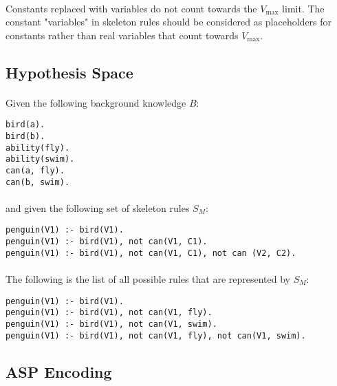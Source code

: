 \documentclass{article}
\theoremstyle{plain}
\theoremstyle{definition}
\begin{document}
\begin{multicols}{2}
\paragraph{} Constants replaced with variables do not count towards the $V_\text{max}$ limit. \cite[p. 6]{lawnonmonotonic} The constant "variables" in skeleton rules should be considered as placeholders for constants rather than real variables that count towards $V_\text{max}$.

\subsection{Hypothesis Space}\label{sec:ASPALHypothesisSpace}

\paragraph{} Given the following background knowledge $B$:

\begin{lstlisting}
bird(a).
bird(b).
ability(fly).
ability(swim).
can(a, fly).
can(b, swim).
\end{lstlisting}

\paragraph{} and given the following set of skeleton rules $S_M$:

\begin{lstlisting}
penguin(V1) :- bird(V1).
penguin(V1) :- bird(V1), not can(V1, C1).
penguin(V1) :- bird(V1), not can(V1, C1), not can (V2, C2).
\end{lstlisting}

\paragraph{} The following is the list of all possible rules that are represented by $S_M$:

\begin{lstlisting}
penguin(V1) :- bird(V1).
penguin(V1) :- bird(V1), not can(V1, fly).
penguin(V1) :- bird(V1), not can(V1, swim).
penguin(V1) :- bird(V1), not can(V1, fly), not can(V1, swim).
\end{lstlisting}

\subsection{ASP Encoding}


\end{multicols}
\end{document}
